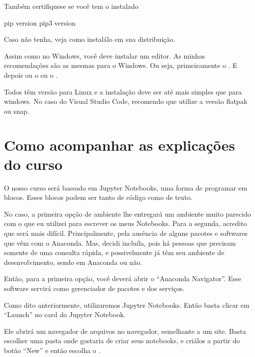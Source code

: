 \documentclass[letterpaper,10pt,english]{jupyterBook}
\begin{document}
\sphinxAtStartPar
Também certifique\sphinxhyphen{}se se você tem o  instalado

\begin{sphinxVerbatim}[commandchars=\\\{\}]
pip \PYGZhy{}\PYGZhy{}version
pip3 \PYGZhy{}\PYGZhy{}version
\end{sphinxVerbatim}

\sphinxAtStartPar
Caso não tenha, veja como instalá\sphinxhyphen{}lo em sua distribuição.

\sphinxAtStartPar
Assim como no Windows, você deve instalar um editor. As minhas recomendações são as mesmas para o Windows. Ou seja, primeiramente o . E depois ou o  ou o .

\sphinxAtStartPar
Todos têm versão para Linux e a instalação deve ser até mais simples que para windows. No caso do Visual Studio Code, recomendo que utilize a versão flatpak ou snap.


\section{Como acompanhar as explicações do curso}
\label{\detokenize{chapters/1:como-acompanhar-as-explicacoes-do-curso}}
\sphinxAtStartPar
O nosso curso será baseado em Jupyter Notebooks, uma forma de programar em blocos. Esses blocos podem ser tanto de código como de texto.

\sphinxAtStartPar
No caso, a primeira opção de ambiente lhe entregará um ambiente muito parecido com o que eu utilizei para escrever os meus Notebooks. Para a segunda, acredito que será mais difícil. Principalmente, pela ausência de alguns pacotes e softwares que vêm com o Anaconda. Mas, decidi incluí\sphinxhyphen{}la, pois há pessoas que precisam somente de uma consulta rápida, e possivelmente já têm seu ambiente de desenvolvimento, sendo em Anaconda ou não.

\sphinxAtStartPar
Então, para a primeira opção, você deverá abrir o “Anaconda Navigator”. Esse software servirá como gerenciador de pacotes e dos serviços.

\sphinxAtStartPar
Como dito anteriormente, utilizaremos Jupyter Notebooks. Então basta clicar em “Launch” no card do Jupyter Notebook.

\sphinxAtStartPar
Ele abrirá um navegador de arquivos no navegador, semelhante a um site. Basta escolher uma pasta onde gostaria de criar seus notebooks, e criá\sphinxhyphen{}los a partir do botão “New” e então escolha o .
\end{document}
